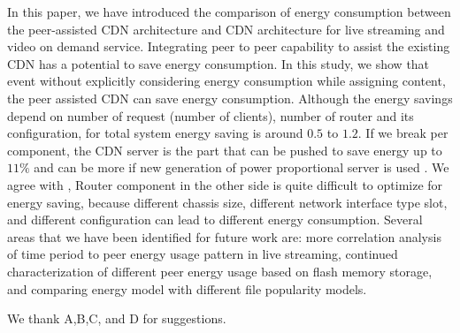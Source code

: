 \documentclass[JIP]{ipsj}
\begin{document}
In this paper, we have introduced the comparison of energy consumption between the peer-assisted CDN architecture and CDN architecture for live streaming and video on demand service.
Integrating peer to peer capability to assist the existing CDN has a potential to save energy consumption.
In this study, we show that event without explicitly considering energy consumption while assigning content, the peer assisted CDN can save energy consumption.
Although the energy savings depend on number of request (number of clients), number of router and its configuration, for total system energy saving is around $0.5$ to $1.2$.
If we break per component, the CDN server is the part that can be pushed to save energy up to $11\%$ and can be more if new generation of power proportional server is used \cite{Krioukov:2011:NDI:1925861.1925878}.
We agree with \cite{4509688}, Router component in the other side is quite difficult to optimize for energy saving, because different chassis size, different network interface type slot, and different configuration can lead to different energy consumption.
Several areas that we have been identified for future work are: more correlation analysis of time period to peer energy usage pattern in live streaming, continued characterization of different peer energy usage based on flash memory storage, and comparing energy model with different file popularity models.



\begin{acknowledgment}
We thank A,B,C, and D for suggestions.
\end{acknowledgment}




\begin{biography}

%
%
%
\end{biography}
\end{document}

